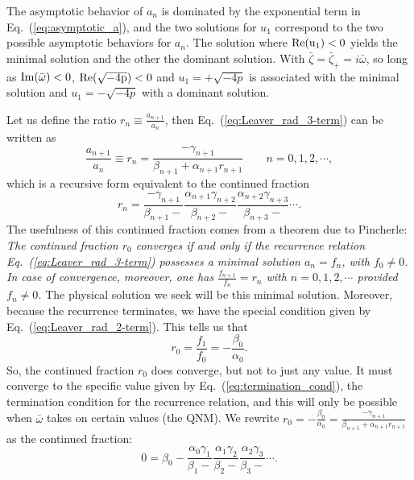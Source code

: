 \documentclass[11pt]{article}
\begin{document}
The asymptotic behavior of $a_n$ is dominated by the exponential term
in Eq.~(\ref{eq:asymptotic_a}), and the two solutions for $u_1$
correspond to the two possible asymptotic behaviors for $a_n$.  The
solution where $\rm{Re}(u_1)<0$ yields the minimal solution and the
other the dominant solution.  With
$\bar\zeta=\bar\zeta_+=i\bar\omega$, so long as
$\rm{Im}(\bar\omega)<0$, $\rm{Re}(\sqrt{-4p})<0$ and $u_1=+\sqrt{-4p}$
is associated with the minimal solution and $u_1=-\sqrt{-4p}$ with a
dominant solution.

Let us define the ratio $r_n\equiv\frac{a_{n+1}}{a_n}$, then
Eq.~(\ref{eq:Leaver_rad_3-term}) can be written as
\begin{equation}
  \frac{a_{n+1}}{a_n} \equiv r_n 
  = \frac{-\gamma_{n+1}}{\beta_{n+1}+ \alpha_{n+1}r_{n+1}}
  \qquad n=0,1,2,\cdots,
\end{equation}
which is a recursive form equivalent to the continued fraction
\begin{equation}\label{eq:Leaver_rad_CF_dom}
r_n 
  = \frac{-\gamma_{n+1}}{\beta_{n+1}-} 
    \frac{\alpha_{n+1}\gamma_{n+2}}{\beta_{n+2}-}
    \frac{\alpha_{n+2}\gamma_{n+3}}{\beta_{n+3}-}\cdots.
\end{equation}
The usefulness of this continued fraction comes from a theorem due to
Pincherle:
 \\ {\em The continued fraction $r_0$ converges if and only
  if the recurrence relation Eq.~(\ref{eq:Leaver_rad_3-term}) possesses
  a minimal solution $a_n=f_n$, with $f_0\ne0$.  In case of
  convergence, moreover, one has $\frac{f_{n+1}}{f_n}=r_n$ with
  $n=0,1,2,\cdots$ provided $f_n\ne0$.}  The physical solution we seek
will be this minimal solution.  Moreover, because the recurrence
terminates, we have the special condition given by
Eq.~(\ref{eq:Leaver_rad_2-term}).  This tells us that
\begin{equation}\label{eq:termination_cond}
  r_0=\frac{f_1}{f_0}=-\frac{\beta_0}{\alpha_0}.
\end{equation}
So, the continued fraction $r_0$ does converge, but not to just any
value.  It must converge to the specific value given by
Eq.~(\ref{eq:termination_cond}), the termination condition for the
recurrence relation, and this will only be possible when $\bar\omega$
takes on certain values (the QNM).  We rewrite
$r_0=-\frac{\beta_0}{\alpha_0}=\frac{-\gamma_{n+1}}{\beta_{n+1}+
  \alpha_{n+1}r_{n+1}}$ as the continued fraction:
\begin{equation}\label{eq:Leaver_Cf_inf}
  0=\beta_0 -\frac{\alpha_0\gamma_1}{\beta_1-}
             \frac{\alpha_1\gamma_2}{\beta_2-}
             \frac{\alpha_2\gamma_3}{\beta_3-}\cdots.
\end{equation}
\end{document}
